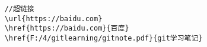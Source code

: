 \documentclass[12pt]{ctexart}
\begin{document}
\begin{verbatim}
    //超链接
    \url{https://baidu.com}
    \href{https://baidu.com}{百度}
    \href{F:/4/gitlearning/gitnote.pdf}{git学习笔记}
\end{verbatim}
\end{document}

